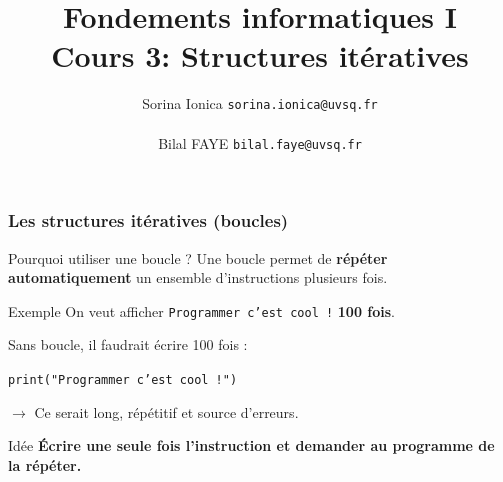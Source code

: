 \documentclass[10pt]{beamer}
\title[IN100 Cours 3]{\textbf{Fondements informatiques I}\\
Cours 3: Structures itératives}
\author[]{Sorina Ionica \texttt{sorina.ionica@uvsq.fr} \\~\\Bilal FAYE  \texttt{bilal.faye@uvsq.fr} }
\institute{}
\date{}
\begin{document}
\frame{\titlepage}

\begin{frame}
	\frametitle{Les structures itératives (boucles)}
	
	
	\begin{block}{Pourquoi utiliser une boucle ?}
		Une boucle permet de \textbf{répéter automatiquement} un ensemble
		d'instructions plusieurs fois.
	\end{block}
	
	\vspace{0.3cm}
	
	\begin{exampleblock}{Exemple}
		On veut afficher \texttt{Programmer c'est cool !} \textbf{100 fois}.
		
		\vspace{0.15cm}
		
		Sans boucle, il faudrait écrire 100 fois :
		
		\begin{center}
			\texttt{print("Programmer c'est cool !")}
		\end{center}
		
		\vspace{0.05cm}
		
		$\rightarrow$ Ce serait long, répétitif et source d'erreurs.
	\end{exampleblock}
	
	\vspace{0.2cm}
	
	\begin{alertblock}{Idée}
		\centering
		\textbf{Écrire une seule fois l'instruction et demander au programme de la répéter.}
	\end{alertblock}
	
	
\end{frame}
\end{document}
